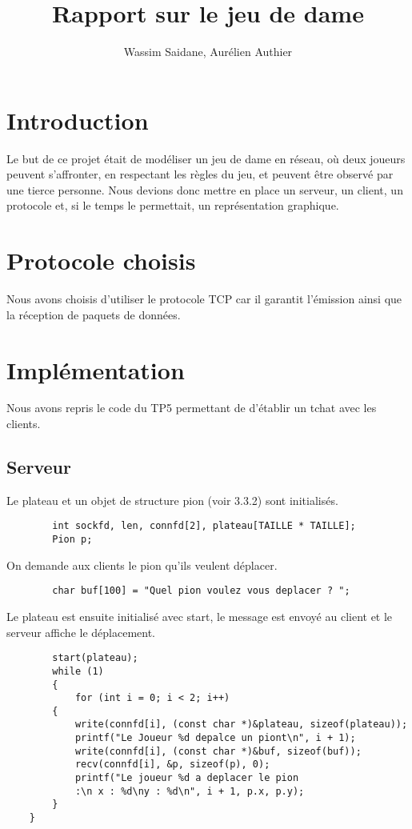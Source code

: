 \documentclass{article}
\title{Rapport sur le jeu de dame}
\author{Wassim Saidane, Aurélien Authier}
\date{}
\begin{document}
    \lstset{language=C}
    \maketitle
    \tableofcontents
    \newpage
    \section{Introduction}
    Le but de ce projet était de modéliser un jeu de dame en réseau, où deux joueurs peuvent s'affronter, en respectant les règles du jeu, et peuvent être observé par une tierce personne. Nous devions donc mettre en place un serveur, un client, un protocole et, si le temps le permettait, un représentation graphique. 

    \section{Protocole choisis}
        Nous avons choisis d'utiliser le protocole TCP car il garantit l’émission ainsi que la réception de paquets de données.
    \section{Implémentation}
        Nous avons repris le code du TP5 permettant de d'établir un tchat avec les clients.
    \subsection{Serveur}
    Le plateau et un objet de structure pion (voir 3.3.2) sont initialisés.
    \begin{lstlisting}
        int sockfd, len, connfd[2], plateau[TAILLE * TAILLE];
        Pion p;
    \end{lstlisting}
    On demande aux clients le pion qu'ils veulent déplacer. 
    \begin{lstlisting}
        char buf[100] = "Quel pion voulez vous deplacer ? ";
    \end{lstlisting}
    Le plateau est ensuite initialisé avec start, le message est envoyé au client et le serveur affiche le déplacement.
    \begin{lstlisting}
        start(plateau);
        while (1)
        {
            for (int i = 0; i < 2; i++)
        {
            write(connfd[i], (const char *)&plateau, sizeof(plateau));
            printf("Le Joueur %d depalce un piont\n", i + 1);
            write(connfd[i], (const char *)&buf, sizeof(buf));
            recv(connfd[i], &p, sizeof(p), 0);
            printf("Le joueur %d a deplacer le pion 
            :\n x : %d\ny : %d\n", i + 1, p.x, p.y);
        }
    }
    \end{lstlisting}
\end{document}
